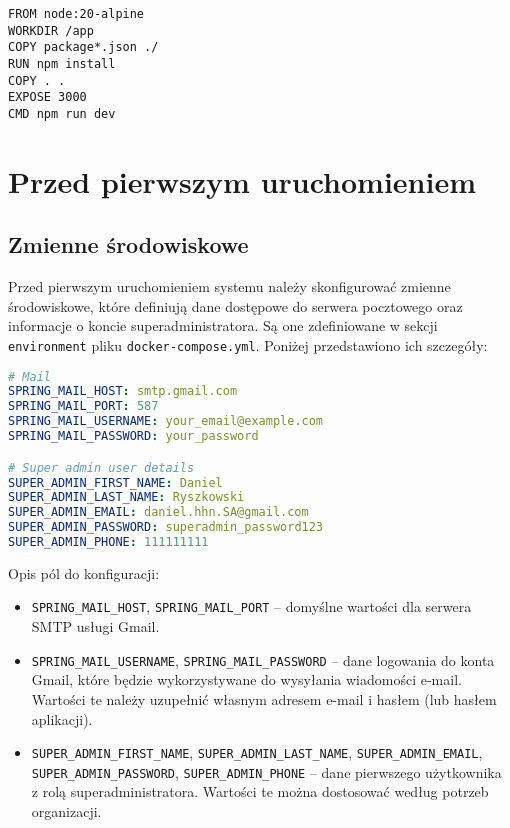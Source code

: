 \begin{lstlisting}[language=docker, caption=Dockerfile frontendu]
FROM node:20-alpine
WORKDIR /app
COPY package*.json ./
RUN npm install
COPY . .
EXPOSE 3000
CMD npm run dev
\end{lstlisting}


\section{Przed pierwszym uruchomieniem}
\subsection{Zmienne środowiskowe}
Przed pierwszym uruchomieniem systemu należy skonfigurować zmienne środowiskowe, które definiują dane dostępowe do serwera pocztowego oraz informacje o koncie superadministratora. Są one zdefiniowane w sekcji \texttt{environment} pliku \texttt{docker-compose.yml}. Poniżej przedstawiono ich szczegóły:

\begin{lstlisting}[language=yaml, caption=Konfiguracja zmiennych środowiskowych]
# Mail
SPRING_MAIL_HOST: smtp.gmail.com
SPRING_MAIL_PORT: 587
SPRING_MAIL_USERNAME: your_email@example.com
SPRING_MAIL_PASSWORD: your_password

# Super admin user details
SUPER_ADMIN_FIRST_NAME: Daniel
SUPER_ADMIN_LAST_NAME: Ryszkowski
SUPER_ADMIN_EMAIL: daniel.hhn.SA@gmail.com
SUPER_ADMIN_PASSWORD: superadmin_password123
SUPER_ADMIN_PHONE: 111111111
\end{lstlisting}

Opis pól do konfiguracji:
\begin{itemize}
    \item \texttt{SPRING\_MAIL\_HOST}, \texttt{SPRING\_MAIL\_PORT} -- domyślne wartości dla serwera SMTP usługi Gmail.
    \item \texttt{SPRING\_MAIL\_USERNAME}, \texttt{SPRING\_MAIL\_PASSWORD} -- dane logowania do konta Gmail, które będzie wykorzystywane do wysyłania wiadomości e-mail. Wartości te należy uzupełnić własnym adresem e-mail i hasłem (lub hasłem aplikacji).
    \item \texttt{SUPER\_ADMIN\_FIRST\_NAME}, \texttt{SUPER\_ADMIN\_LAST\_NAME}, \texttt{SUPER\_ADMIN\_EMAIL}, \texttt{SUPER\_ADMIN\_PASSWORD}, \texttt{SUPER\_ADMIN\_PHONE} -- dane pierwszego użytkownika z rolą superadministratora. Wartości te można dostosować według potrzeb organizacji.
\end{itemize}

